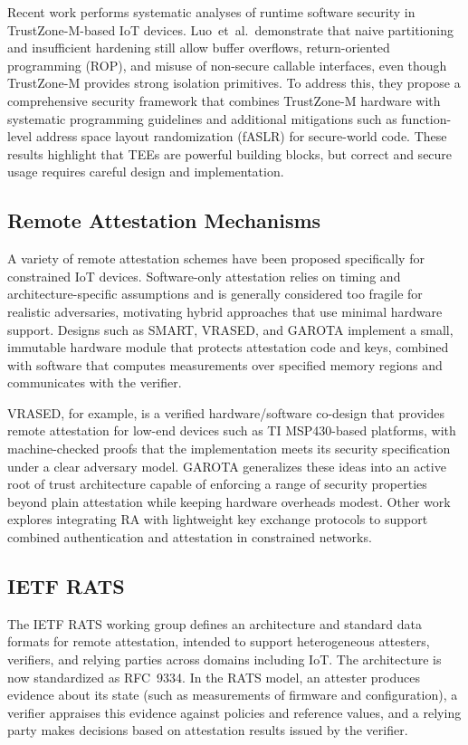 \documentclass[conference,11pt,a4paper]{IEEEtran}
\begin{document}
Recent work performs systematic analyses of runtime software security in TrustZone-M-based IoT devices. Luo~et~al.\ demonstrate that naive partitioning and insufficient hardening still allow buffer overflows, return-oriented programming (ROP), and misuse of non-secure callable interfaces, even though TrustZone-M provides strong isolation primitives.\cite{tzm_runtime} To address this, they propose a comprehensive security framework that combines TrustZone-M hardware with systematic programming guidelines and additional mitigations such as function-level address space layout randomization (fASLR) for secure-world code.\cite{tzm_framework} These results highlight that TEEs are powerful building blocks, but correct and secure usage requires careful design and implementation.\cite{tee_trustcom}

\subsection{Remote Attestation Mechanisms}
A variety of remote attestation schemes have been proposed specifically for constrained IoT devices. Software-only attestation relies on timing and architecture-specific assumptions and is generally considered too fragile for realistic adversaries, motivating hybrid approaches that use minimal hardware support.\cite{ra_survey,resource_constrained} Designs such as SMART, VRASED, and GAROTA implement a small, immutable hardware module that protects attestation code and keys, combined with software that computes measurements over specified memory regions and communicates with the verifier.\cite{root_of_trust_lowend,vRased_usenix}

VRASED, for example, is a verified hardware/software co-design that provides remote attestation for low-end devices such as TI MSP430-based platforms, with machine-checked proofs that the implementation meets its security specification under a clear adversary model.\cite{vRased_usenix} GAROTA generalizes these ideas into an active root of trust architecture capable of enforcing a range of security properties beyond plain attestation while keeping hardware overheads modest.\cite{root_of_trust_lowend} Other work explores integrating RA with lightweight key exchange protocols to support combined authentication and attestation in constrained networks.\cite{ra_survey,resource_constrained}

\subsection{IETF RATS}
The IETF RATS working group defines an architecture and standard data formats for remote attestation, intended to support heterogeneous attesters, verifiers, and relying parties across domains including IoT. The architecture is now standardized as RFC~9334.\cite{rats_arch} In the RATS model, an attester produces evidence about its state (such as measurements of firmware and configuration), a verifier appraises this evidence against policies and reference values, and a relying party makes decisions based on attestation results issued by the verifier.
\end{document}
